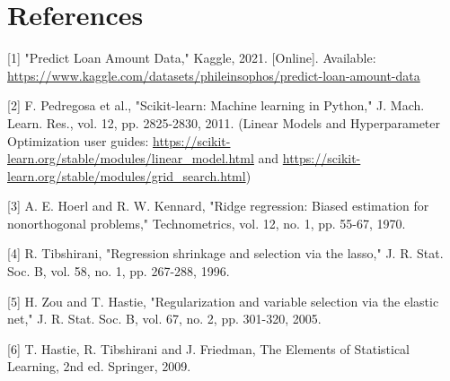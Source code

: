 \documentclass[11pt]{article}
\begin{document}
\section*{References}
\label{sec:orgcae0442}


[1] "Predict Loan Amount Data," Kaggle, 2021. [Online]. Available: \url{https://www.kaggle.com/datasets/phileinsophos/predict-loan-amount-data}

[2] F. Pedregosa et al., "Scikit-learn: Machine learning in Python," J. Mach. Learn. Res., vol. 12, pp. 2825-2830, 2011. (Linear Models and Hyperparameter Optimization user guides: \url{https://scikit-learn.org/stable/modules/linear\_model.html} and \url{https://scikit-learn.org/stable/modules/grid\_search.html})

[3] A. E. Hoerl and R. W. Kennard, "Ridge regression: Biased estimation for nonorthogonal problems," Technometrics, vol. 12, no. 1, pp. 55-67, 1970.

[4] R. Tibshirani, "Regression shrinkage and selection via the lasso," J. R. Stat. Soc. B, vol. 58, no. 1, pp. 267-288, 1996.

[5] H. Zou and T. Hastie, "Regularization and variable selection via the elastic net," J. R. Stat. Soc. B, vol. 67, no. 2, pp. 301-320, 2005.

[6] T. Hastie, R. Tibshirani and J. Friedman, The Elements of Statistical Learning, 2nd ed. Springer, 2009.
\end{document}
